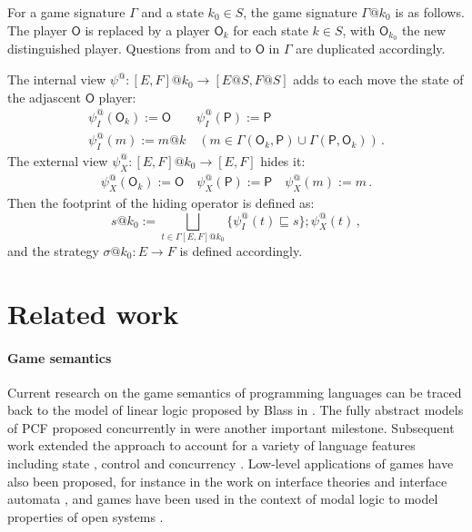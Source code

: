 \documentclass[sigplan,screen]{acmart}
\newcommand{\kw}[1]{\ensuremath{ \mathsf{#1} }}
\begin{document}
\begin{definition}
For a game signature $\Gamma$
and a state $k_0 \in S$,
the game signature $\Gamma@k_0$
is as follows.
The player $\kw{O}$ is replaced by
a player $\kw{O}_k$ for each state $k \in S$,
with $\kw{O}_{k_0}$ the new distinguished player.
Questions from and to $\kw{O}$ in $\Gamma$
are duplicated accordingly.
\end{definition}

The internal view $\psi^@ : [E,F]@k_0 \rightarrow [E@S, F@S]$
adds to each move the state of
the adjascent $\kw{O}$ player:
\begin{gather*}
  \psi^@_I(\kw{O}_k) := \kw{O} \qquad
  \psi^@_I(\kw{P}) := \kw{P} \\
  \psi^@_I(m) := m@k \quad
  (m \in \Gamma(\kw{O}_k, \kw{P}) \cup \Gamma(\kw{P}, \kw{O}_k)) \,.
\end{gather*}
The external view $\psi^@_X : [E,F]@k_0 \rightarrow [E,F]$
hides it:
\begin{gather*}
  \psi^@_X(\kw{O}_k) := \kw{O} \quad
  \psi^@_X(\kw{P}) := \kw{P} \quad
  \psi^@_X(m) := m \,.
\end{gather*}
Then the footprint of the hiding operator is defined as:
\[
  s@k_0 := \bigsqcup_{t \in \Gamma [E,F]@k_0}
    \{ \psi^@_I(t) \sqsubseteq s \} ; \psi^@_X(t) \,,
\]
and the strategy $\sigma@k_0 : E \rightarrow F$
is defined accordingly.



\section{Related work} \label{sec:rw} %

%

\paragraph{Game semantics}

Current research on the game semantics of programming languages
can be traced back to the model of linear logic
proposed by Blass in \cite{gsll}.
The fully abstract models of PCF proposed concurrently in
\cite{pcfajm,pcfho} were another important milestone.
Subsequent work
extended the approach to account for a variety of
language features including
state \cite{gsia},
control \cite{gscontrol} and
concurrency \cite{asfgc,agames,cgames}.
Low-level applications of games have also been proposed,
for instance in the work on interface theories
and interface automata \cite{ia,gmos,itcd,gtf},
and games have been used in the context of modal logic
to model properties of open systems
\cite{atl,altref}.
\end{document}
